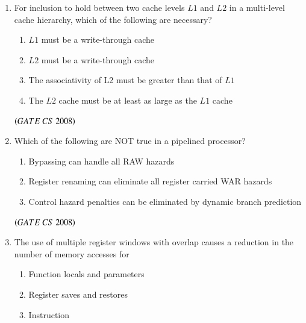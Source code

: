 \documentclass[journal]{IEEEtran}
\numberwithin{equation}{enumi}
\numberwithin{figure}{enumi}
\begin{document}
\begin{enumerate}
\item For inclusion to hold between two cache levels $L1$ and $L2$ in a multi-level cache hierarchy, which of the following are necessary?
\begin{enumerate}   
   \item $L1$ must be a write-through cache
   \item $L2$ must be a write-through cache
   \item The associativity of L2 must be greater than that of $L1$
   \item The $L2$ cache must be at least as large as the $L1$ cache
\end{enumerate}

 \begin{enumerate}
\end{enumerate}
\hfill $\left(GATE\ CS\  2008\right)$

\item Which of the following are NOT true in a pipelined processor?
\begin{enumerate}   
   \item Bypassing can handle all RAW hazards 
   \item Register renaming can eliminate all register carried WAR hazards
   \item Control hazard penalties can be eliminated by dynamic branch prediction
\end{enumerate}

 \begin{enumerate}
\end{enumerate}
\hfill $\left(GATE\ CS\  2008\right)$

\item The use of multiple register windows with overlap causes a reduction in the number of memory accesses for 
\begin{enumerate}   
   \item Function locals and parameters
   \item Register saves and restores
   \item Instruction
\end{enumerate}


\end{enumerate}
\end{document}
